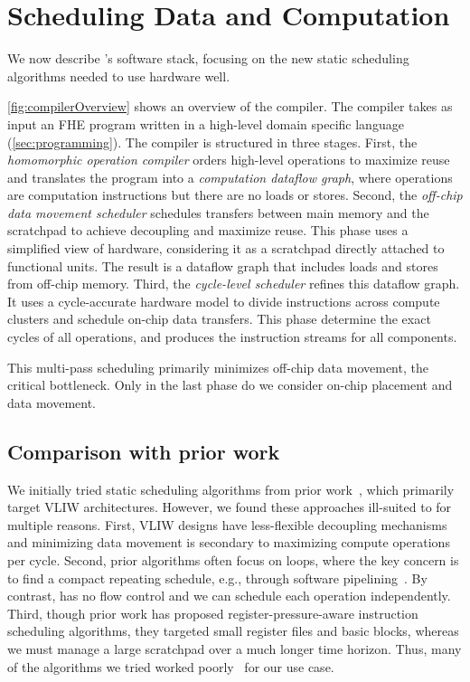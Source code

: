 \chapter{Scheduling Data and Computation}\label{sec:scheduler}

We now describe \name's software stack,
focusing on the new static scheduling algorithms
needed to use hardware well.

\figCompilerOverview

\autoref{fig:compilerOverview} shows an overview of the \name compiler.
The compiler takes as input an FHE program written in a high-level domain specific language (\autoref{sec:programming}).
The compiler is structured in three stages.
First, the \emph{homomorphic operation compiler} 
orders high-level operations to maximize reuse and
translates the program into a \emph{computation dataflow graph},
where operations are computation instructions but there are no loads or stores.
Second, the \emph{off-chip data movement scheduler} %
schedules transfers between main memory and the scratchpad to achieve decoupling and maximize reuse.
This phase uses a simplified view of hardware, considering it as
a scratchpad directly attached to functional units. %
The result is a dataflow graph that includes loads and stores from off-chip memory.
Third, the \emph{cycle-level scheduler} refines this dataflow graph.
It uses a cycle-accurate hardware model to divide instructions across compute clusters
and schedule on-chip data transfers.
This phase determine the exact cycles of all operations, and produces the instruction streams for all components.

This multi-pass scheduling primarily minimizes off-chip data movement, the critical bottleneck.
Only in the last phase do we consider on-chip placement and data movement.

\section{Comparison with prior work}

We initially tried static scheduling algorithms from prior work~\cite{blelloch:acm1999:provably,marchal:jpdc2019:limiting,goodman:ics1988:code,ozer:micro1998:unified,barany:odes2011:register},
which primarily target VLIW architectures.
However, we found these approaches ill-suited to \name for multiple reasons.
First, VLIW designs have less-flexible decoupling mechanisms
and minimizing data movement is secondary to maximizing compute operations per cycle.
Second, prior algorithms often focus on loops,
where the key concern is to find a compact repeating schedule,
e.g., through software pipelining~\cite{lam1989software}.
By contrast, \name has no flow control and we can 
schedule each operation independently.
Third, though prior work has proposed register-pressure-aware
instruction scheduling algorithms,
they targeted small register files and basic blocks,
whereas we must manage a large scratchpad over a much longer time horizon.
Thus, many of the algorithms we tried worked poorly~\cite{ozer:micro1998:unified, goodman:ics1988:code, marchal:jpdc2019:limiting} for our use case.

